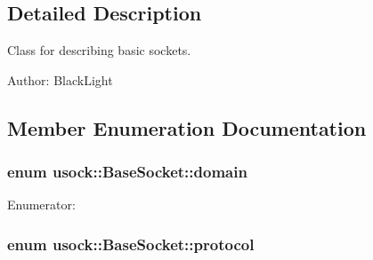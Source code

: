 \subsection{Detailed Description}
Class for describing basic sockets. 

\begin{Desc}
\item[Author:]BlackLight \end{Desc}


\subsection{Member Enumeration Documentation}
\hypertarget{classusock_1_1BaseSocket_a51cae0b366638a5f697f64174135d90}{
\subsubsection[{domain}]{\setlength{\rightskip}{0pt plus 5cm}enum {\bf usock::BaseSocket::domain}}}
\label{classusock_1_1BaseSocket_a51cae0b366638a5f697f64174135d90}


\begin{Desc}
\item[Enumerator: ]\par
\begin{description}
\item[{\em 
\hypertarget{classusock_1_1BaseSocket_a51cae0b366638a5f697f64174135d904293c75d794987e0017bab42bbbcbf73}{
inet}
\label{classusock_1_1BaseSocket_a51cae0b366638a5f697f64174135d904293c75d794987e0017bab42bbbcbf73}
}]\item[{\em 
\hypertarget{classusock_1_1BaseSocket_a51cae0b366638a5f697f64174135d9089db67cd78ea92b1ca5bf823ca967680}{
inet6}
\label{classusock_1_1BaseSocket_a51cae0b366638a5f697f64174135d9089db67cd78ea92b1ca5bf823ca967680}
}]\end{description}
\end{Desc}

\hypertarget{classusock_1_1BaseSocket_09208675b41c416fb402824742963eaa}{
\subsubsection[{protocol}]{\setlength{\rightskip}{0pt plus 5cm}enum {\bf usock::BaseSocket::protocol}}}
\label{classusock_1_1BaseSocket_09208675b41c416fb402824742963eaa}


